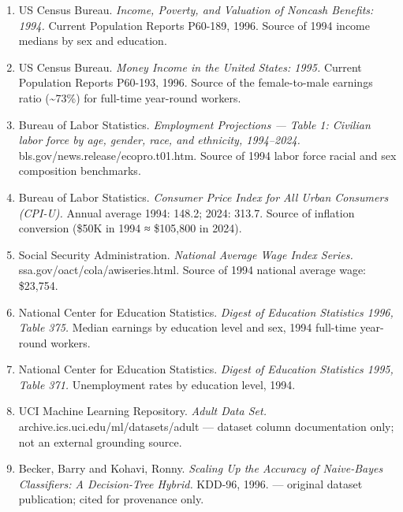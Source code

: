 \documentclass[
  letterpaper,
  DIV=11,
  numbers=noendperiod]{scrartcl}
\providecommand{\tightlist}{%
  \setlength{\itemsep}{0pt}\setlength{\parskip}{0pt}}\usepackage{longtable,booktabs,array}
\begin{document}
\begin{enumerate}
\def\labelenumi{\arabic{enumi}.}
\tightlist
\item
  US Census Bureau. \emph{Income, Poverty, and Valuation of Noncash
  Benefits: 1994.} Current Population Reports P60-189, 1996. Source of
  1994 income medians by sex and education.
\item
  US Census Bureau. \emph{Money Income in the United States: 1995.}
  Current Population Reports P60-193, 1996. Source of the female-to-male
  earnings ratio (\textasciitilde73\%) for full-time year-round workers.
\item
  Bureau of Labor Statistics. \emph{Employment Projections --- Table 1:
  Civilian labor force by age, gender, race, and ethnicity, 1994--2024.}
  bls.gov/news.release/ecopro.t01.htm. Source of 1994 labor force racial
  and sex composition benchmarks.
\item
  Bureau of Labor Statistics. \emph{Consumer Price Index for All Urban
  Consumers (CPI-U).} Annual average 1994: 148.2; 2024: 313.7. Source of
  inflation conversion (\$50K in 1994 ≈ \$105,800 in 2024).
\item
  Social Security Administration. \emph{National Average Wage Index
  Series.} ssa.gov/oact/cola/awiseries.html. Source of 1994 national
  average wage: \$23,754.
\item
  National Center for Education Statistics. \emph{Digest of Education
  Statistics 1996, Table 375.} Median earnings by education level and
  sex, 1994 full-time year-round workers.
\item
  National Center for Education Statistics. \emph{Digest of Education
  Statistics 1995, Table 371.} Unemployment rates by education level,
  1994.
\item
  UCI Machine Learning Repository. \emph{Adult Data Set.}
  archive.ics.uci.edu/ml/datasets/adult --- dataset column documentation
  only; not an external grounding source.
\item
  Becker, Barry and Kohavi, Ronny. \emph{Scaling Up the Accuracy of
  Naive-Bayes Classifiers: A Decision-Tree Hybrid.} KDD-96, 1996. ---
  original dataset publication; cited for provenance only.
\end{enumerate}
\end{document}
